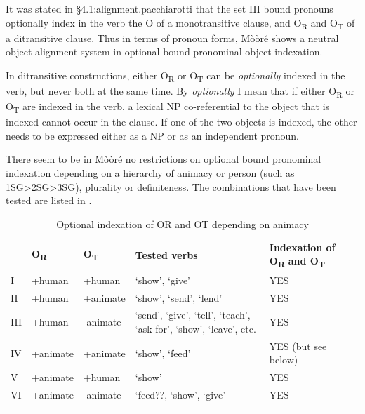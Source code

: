\documentclass[output=paper]{langsci/langscibook}
\begin{document}
\z

It was stated in {§4.1:alignment.pacchiarotti} that the set III bound pronouns optionally index in the verb the O of a monotransitive clause, and O\textsubscript{R} and O\textsubscript{T} of a ditransitive clause. Thus in terms of pronoun forms, M\`{o}\`{o}r\'{e} shows a neutral object alignment system in optional bound pronominal object indexation.  

In ditransitive constructions, either O\textsubscript{R} or O\textsubscript{T} can be \textit{optionally} indexed in the verb, but never both at the same time. By \textit{optionally} I mean that if either O\textsubscript{R} or O\textsubscript{T} are indexed in the verb, a lexical NP co-referential to the object that is indexed cannot occur in the clause. If one of the two objects is indexed, the other needs to be expressed either as a NP or as an independent pronoun. 

There seem to be in M\`{o}\`{o}r\'{e} no restrictions on optional bound pronominal indexation depending on a hierarchy of animacy or person (such as 1SG{\textgreater}2SG{\textgreater}3SG), plurality or definiteness. The combinations that have been tested are listed in .

\begin{table}
\begin{tabular}{lllll} & \textbf{O}\textbf{\textsubscript{R}} & \textbf{O}\textbf{\textsubscript{T}} & \textbf{Tested verbs} & \textbf{Indexation of O}\textbf{\textsubscript{R}}\textbf{ and O}\textbf{\textsubscript{T}}\textbf{ }\\
\lsptoprule
I & +human & +human & `show', `give' & YES\\
II & +human & +animate & `show', `send', `lend' & YES\\
III & +human & -animate & `send', `give', `tell', `teach', `ask for', `show', `leave', etc. & YES\\
IV & +animate & +animate & `show', `feed' & YES (but see below)\\
V & +animate & +human & `show' & YES\\
VI & +animate & -animate & `feed??, `show', `give' & YES\\
\lspbottomrule
\end{tabular}
\caption{Optional indexation of OR and OT depending on animacy}
\label{tab:3.pacchiarotti}

 \end{table}
\end{document}
